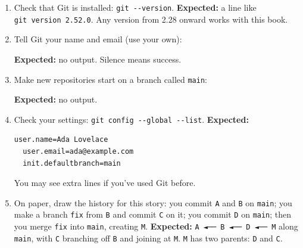 \begin{enumerate}
\def\labelenumi{\arabic{enumi}.}
\item
  Check that Git is installed: \texttt{git\ -\/-version}. \textbf{Expected:} a line like \texttt{git\ version\ 2.52.0}. Any version from 2.28 onward works with this book.
\item
  Tell Git your name and email (use your own):

  \begin{codeblock}

\begin{Shaded}
\begin{Highlighting}[]
\end{Highlighting}
\end{Shaded}

  \end{codeblock}

  \textbf{Expected:} no output. Silence means success.
\item
  Make new repositories start on a branch called \texttt{main}:

  \begin{codeblock}

\begin{Shaded}
\begin{Highlighting}[]
\end{Highlighting}
\end{Shaded}

  \end{codeblock}

  \textbf{Expected:} no output.
\item
  Check your settings: \texttt{git\ config\ -}\allowbreak{}\texttt{-}\allowbreak{}\texttt{global\ -}\allowbreak{}\texttt{-}\allowbreak{}\texttt{list}. \textbf{Expected:}

  \begin{codeblock}
  \begin{Verbatim}[formatcom=\outputstyle]
  user.name=Ada Lovelace
  user.email=ada@example.com
  init.defaultbranch=main
  \end{Verbatim}
  \end{codeblock}

  You may see extra lines if you've used Git before.
\item
  On paper, draw the history for this story: you commit \texttt{A} and \texttt{B} on \texttt{main}; you make a branch \texttt{fix} from \texttt{B} and commit \texttt{C} on it; you commit \texttt{D} on \texttt{main}; then you merge \texttt{fix} into \texttt{main}, creating \texttt{M}. \textbf{Expected:} \texttt{A\ ◄──\ B\ ◄──\ D\ ◄──\ M} along \texttt{main}, with \texttt{C} branching off \texttt{B} and joining at \texttt{M}. \texttt{M} has two parents: \texttt{D} and \texttt{C}.
\end{enumerate}

